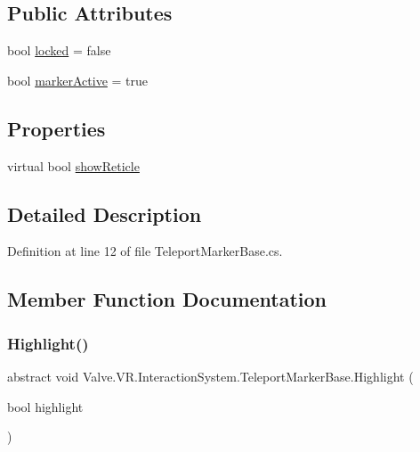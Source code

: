 \subsection*{Public Attributes}
\begin{DoxyCompactItemize}
\item 
bool \mbox{\hyperlink{class_valve_1_1_v_r_1_1_interaction_system_1_1_teleport_marker_base_a0fe663ebf0fb74cfb7d6f5ca28c83493}{locked}} = false
\item 
bool \mbox{\hyperlink{class_valve_1_1_v_r_1_1_interaction_system_1_1_teleport_marker_base_ac2f72ac96272eea62a0b5aa9bbd202b7}{marker\+Active}} = true
\end{DoxyCompactItemize}
\subsection*{Properties}
\begin{DoxyCompactItemize}
\item 
virtual bool \mbox{\hyperlink{class_valve_1_1_v_r_1_1_interaction_system_1_1_teleport_marker_base_adc6c72ef843ea02dc026952098163f80}{show\+Reticle}}
\end{DoxyCompactItemize}


\subsection{Detailed Description}


Definition at line 12 of file Teleport\+Marker\+Base.\+cs.



\subsection{Member Function Documentation}
\mbox{\label{class_valve_1_1_v_r_1_1_interaction_system_1_1_teleport_marker_base_ab2505033275992613453b17981dd4053}} 
\subsubsection{\texorpdfstring{Highlight()}{Highlight()}}
{\footnotesize\ttfamily abstract void Valve.\+V\+R.\+Interaction\+System.\+Teleport\+Marker\+Base.\+Highlight (\begin{DoxyParamCaption}\item[{bool}]{highlight }\end{DoxyParamCaption})\hspace{0.3cm}{\ttfamily [pure virtual]}}



